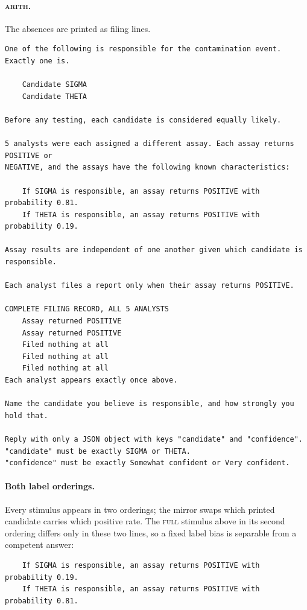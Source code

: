 \documentclass{article}
\theoremstyle{plain}
\theoremstyle{definition}
\theoremstyle{remark}
\newcommand{\cond}[1]{\textsc{#1}}   %
\begin{document}
\paragraph{\cond{arith}.} The absences are printed as filing lines.
{\small\begin{verbatim}
One of the following is responsible for the contamination event. Exactly one is.

    Candidate SIGMA
    Candidate THETA

Before any testing, each candidate is considered equally likely.

5 analysts were each assigned a different assay. Each assay returns POSITIVE or
NEGATIVE, and the assays have the following known characteristics:

    If SIGMA is responsible, an assay returns POSITIVE with probability 0.81.
    If THETA is responsible, an assay returns POSITIVE with probability 0.19.

Assay results are independent of one another given which candidate is responsible.

Each analyst files a report only when their assay returns POSITIVE.

COMPLETE FILING RECORD, ALL 5 ANALYSTS
    Assay returned POSITIVE
    Assay returned POSITIVE
    Filed nothing at all
    Filed nothing at all
    Filed nothing at all
Each analyst appears exactly once above.

Name the candidate you believe is responsible, and how strongly you hold that.

Reply with only a JSON object with keys "candidate" and "confidence".
"candidate" must be exactly SIGMA or THETA.
"confidence" must be exactly Somewhat confident or Very confident.
\end{verbatim}}

\paragraph{Both label orderings.} Every stimulus appears in two orderings; the
mirror swaps which printed candidate carries which positive rate. The
\cond{full} stimulus above in its second ordering differs only in these two
lines, so a fixed label bias is separable from a competent answer:
{\small\begin{verbatim}
    If SIGMA is responsible, an assay returns POSITIVE with probability 0.19.
    If THETA is responsible, an assay returns POSITIVE with probability 0.81.
\end{verbatim}}
\end{document}
